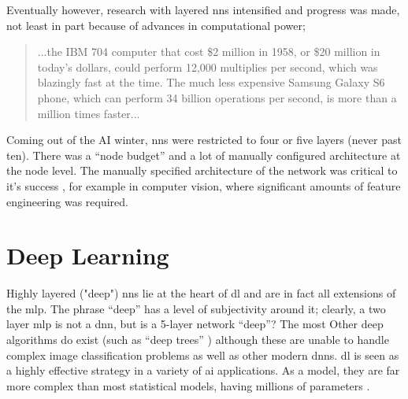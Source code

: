

Eventually however, research with layered \gls{nn}s intensified and progress was made, not least in part because of advances in computational power;

\begin{quote}
...the IBM 704 computer that cost \$2 million in 1958, or \$20 million in today’s dollars, could perform 12,000 multiplies per second, which was blazingly fast at the time. The much less expensive Samsung Galaxy S6 phone, which can perform 34 billion operations per second, is more than a million times faster...\cite{unreasonable_dl}
\end{quote}

\bigskip
Coming out of the AI winter, \gls{nn}s were restricted to four or five layers (never past ten). There was a \enquote{node budget} and a lot of manually configured architecture at the node level. The manually specified architecture of the network was critical to it's success \cite{manual_architecture}, for example in computer vision, where significant amounts of feature engineering was required. 
\bigskip



\section{Deep Learning}


Highly layered ("deep") \gls{nn}s lie at the heart of \gls{dl} and are in fact all extensions of the \gls{mlp}. The phrase \enquote{deep} has a level of subjectivity around it; clearly, a two \gls{layer} \gls{mlp} is not a \gls{dnn}, but is a 5-layer network \enquote{deep}? The most Other deep algorithms do exist (such as \enquote{deep trees} \cite{deep_forest}) although these are unable to handle complex image classification problems as well as other modern {dnn}s. \gls{dl} is seen as a highly effective strategy in a variety of \gls{ai} applications. As a model, they are far more complex than most statistical models, having millions of parameters \cite{unreasonable_dl}.  
\bigskip

